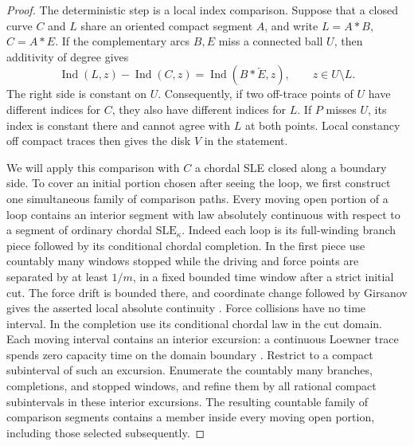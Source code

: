 \documentclass[11pt]{article}
\numberwithin{equation}{section}
\theoremstyle{definition}
\theoremstyle{remark}
\newcommand{\1}{\mathbf 1}
\begin{document}
\begin{proof}
The deterministic step is a local index comparison.  Suppose that a
closed curve $C$ and $L$ share an oriented compact segment $A$, and
write $L=A*B$, $C=A*E$.  If the complementary arcs $B,E$ miss a
connected ball $U$, then additivity of degree gives
\begin{equation}\label{loop:index-difference}
 \operatorname{Ind}(L,z)-\operatorname{Ind}(C,z)
   =\operatorname{Ind}(B*\overleftarrow E,z),
 \qquad z\in U\setminus L.
\end{equation}
The right side is constant on $U$.  Consequently, if two off-trace
points of $U$ have different indices for $C$, they also have different
indices for $L$.  If $P$ misses $U$, its index is constant there and
cannot agree with $L$ at both points.  Local constancy off compact
traces then gives the disk $V$ in the statement.

We will apply this comparison with $C$ a chordal SLE closed along a
boundary side.  To cover an initial portion chosen after seeing the
loop, we first construct one simultaneous family of comparison paths.
Every moving open portion of a loop contains an interior segment with
law absolutely continuous with respect to a segment of ordinary
chordal $\mathrm{SLE}_{\kappa}$.  Indeed each loop is its full-winding
branch piece followed by its conditional chordal completion.  In the
first piece use countably many windows stopped while the driving and
force points are separated by at least $1/m$, in a fixed bounded time
window after a strict initial cut.  The force drift is bounded there,
and coordinate change followed by Girsanov gives the asserted local
absolute continuity \cite[Theorem~3 and Section~5]
{SchrammWilsonCoordinateChanges}.  Force collisions have no time
interval.  In the completion use its conditional chordal law in the
cut domain.  Each moving interval contains an interior excursion:
a continuous Loewner trace spends zero capacity time on the domain
boundary \cite[Proposition~1.7]{YuanLoewnerTraces}.  Restrict to a
compact subinterval of such an excursion.  Enumerate the countably many
branches, completions, and stopped windows, and refine them by all
rational compact subintervals in these interior excursions.  The
resulting countable family of comparison segments contains a member
inside every moving open portion, including those selected subsequently.


\end{proof}
\end{document}
